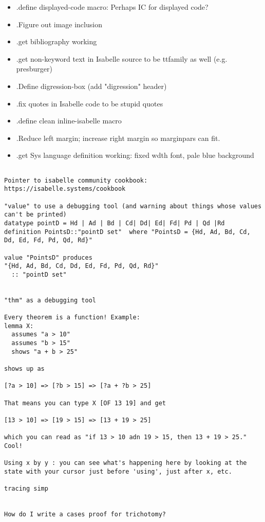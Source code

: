 \begin{itemize}
\item .define displayed-code macro: Perhaps IC for displayed code? 
\item .Figure out image inclusion
\item .get bibliography working
\item .get non-keyword text in Isabelle source to be ttfamily as well (e.g. presburger)
\item .Define digression-box (add "digression" header)
\item .fix quotes in Isabelle code to be stupid quotes
\item .define clean inline-isabelle macro 
\item .Reduce left margin; increase right margin so marginpars can fit.
\item .get Sys language definition working: fixed wdth font, pale blue background
\end{itemize}

\begin{verbatim}

Pointer to isabelle community cookbook: https://isabelle.systems/cookbook

"value" to use a debugging tool (and warning about things whose values can't be printed)
datatype pointD = Hd | Ad | Bd | Cd| Dd| Ed| Fd| Pd | Qd |Rd
definition PointsD::"pointD set"  where "PointsD = {Hd, Ad, Bd, Cd, Dd, Ed, Fd, Pd, Qd, Rd}"

value "PointsD" produces
"{Hd, Ad, Bd, Cd, Dd, Ed, Fd, Pd, Qd, Rd}"
  :: "pointD set"


"thm" as a debugging tool

Every theorem is a function! Example: 
lemma X: 
  assumes "a > 10"
  assumes "b > 15"
  shows "a + b > 25"
  
shows up as 

[?a > 10] => [?b > 15] => [?a + ?b > 25]

That means you can type X [OF 13 19] and get

[13 > 10] => [19 > 15] => [13 + 19 > 25]

which you can read as "if 13 > 10 adn 19 > 15, then 13 + 19 > 25." Cool!

Using x by y : you can see what's happening here by looking at the state with your cursor just before 'using', just after x, etc. 

tracing simp


How do I write a cases proof for trichotomy? 

\end{verbatim}


